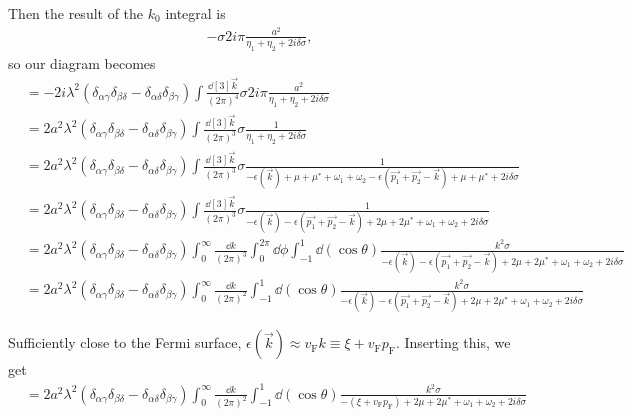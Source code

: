 \documentclass{article}
\newcommand{\pf}{p_{\mathrm{F}}}
\newcommand{\vf}{v_{\mathrm{F}}}
\newcommand{\corr}{\mu^\ast}
\begin{document}
Then the result of the $k_0$ integral is
\begin{align}
	-\sigma 2 i \pi \frac{a^2}{\eta_1 + \eta_2 + 2 i \delta \sigma},
\end{align}
so our diagram becomes
\begin{align}
	&= - 2 i \lambda^2 \left(\delta_{\alpha\gamma} \delta_{\beta\delta} -  \delta_{\alpha\delta} \delta_{\beta \gamma}\right)\int \frac{\dd[3]{\vec{k}}}{\left(2\pi\right)^4} \sigma 2 i \pi \frac{a^2}{\eta_1 + \eta_2 + 2 i \delta \sigma} \\
	&= 2 a^2 \lambda^2 \left(\delta_{\alpha\gamma} \delta_{\beta\delta} -  \delta_{\alpha\delta} \delta_{\beta \gamma}\right)\int \frac{\dd[3]{\vec{k}}}{\left(2\pi\right)^3} \sigma \frac{1}{\eta_1 + \eta_2 + 2 i \delta \sigma} \\
	&= 2 a^2 \lambda^2 \left(\delta_{\alpha\gamma} \delta_{\beta\delta} -  \delta_{\alpha\delta} \delta_{\beta \gamma}\right)\int \frac{\dd[3]{\vec{k}}}{\left(2\pi\right)^3} \sigma \frac{1}{ - \epsilon(\vec{k}) + \mu + \corr + \omega_1 + \omega_2 - \epsilon(\vec{p_1} + \vec{p_2} - \vec{k}) + \mu + \corr + 2 i \delta \sigma} \\
	&= 2 a^2 \lambda^2 \left(\delta_{\alpha\gamma} \delta_{\beta\delta} -  \delta_{\alpha\delta} \delta_{\beta \gamma}\right)\int \frac{\dd[3]{\vec{k}}}{\left(2\pi\right)^3} \sigma \frac{1}{- \epsilon(\vec{k}) - \epsilon(\vec{p_1} + \vec{p_2} - \vec{k}) + 2\mu + 2\corr + \omega_1 + \omega_2 + 2 i \delta \sigma} \\
	&= 2 a^2 \lambda^2 \left(\delta_{\alpha\gamma} \delta_{\beta\delta} -  \delta_{\alpha\delta} \delta_{\beta \gamma}\right)\int_0^\infty \frac{\dd{k}}{\left(2\pi\right)^3} \int_0^{2 \pi} \dd{\phi} \int_{-1}^{1} \dd(\cos{\theta}) \frac{k^2 \sigma }{- \epsilon(\vec{k}) - \epsilon(\vec{p_1} + \vec{p_2} - \vec{k}) + 2\mu + 2\corr + \omega_1 + \omega_2 + 2 i \delta \sigma}  \\
	&= 2 a^2 \lambda^2 \left(\delta_{\alpha\gamma} \delta_{\beta\delta} -  \delta_{\alpha\delta} \delta_{\beta \gamma}\right)\int_0^\infty \frac{\dd{k}}{\left(2\pi\right)^2} \int_{-1}^{1} \dd(\cos{\theta}) \frac{k^2 \sigma }{- \epsilon(\vec{k}) - \epsilon(\vec{p_1} + \vec{p_2} - \vec{k}) + 2\mu + 2\corr + \omega_1 + \omega_2 + 2 i \delta \sigma}
\end{align}

Sufficiently close to the Fermi surface, $\epsilon(\vec{k}) \approx \vf k \equiv \xi + \vf \pf$.
Inserting this, we get
\begin{align}
	&= 2 a^2 \lambda^2 \left(\delta_{\alpha\gamma} \delta_{\beta\delta} -  \delta_{\alpha\delta} \delta_{\beta \gamma}\right)\int_0^\infty \frac{\dd{k}}{\left(2\pi\right)^2} \int_{-1}^{1} \dd(\cos{\theta}) \frac{k^2 \sigma }{-\left( \xi + \vf \pf \right) + 2\mu + 2\corr + \omega_1 + \omega_2 + 2 i \delta \sigma} \\
\end{align}
\end{document}
